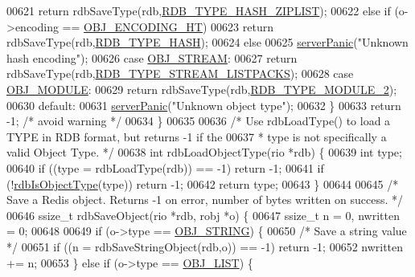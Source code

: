 \begin{DoxyCode}
{{{{{{{{00621             \textcolor{keywordflow}{return} rdbSaveType(rdb,\hyperlink{rdb_8h_af7ff565f65a30ccd4bf55f1503b63946}{RDB\_TYPE\_HASH\_ZIPLIST});
00622         \textcolor{keywordflow}{else} \textcolor{keywordflow}{if} (o->encoding == \hyperlink{server_8h_a9c10219f68afc557d510d108257d238b}{OBJ\_ENCODING\_HT})
00623             \textcolor{keywordflow}{return} rdbSaveType(rdb,\hyperlink{rdb_8h_a61a89168792f4d82b4e5b0e3b02a68ca}{RDB\_TYPE\_HASH});
00624         \textcolor{keywordflow}{else}
00625             \hyperlink{server_8h_a11cc378e7778a830b41240578de3b204}{serverPanic}(\textcolor{stringliteral}{"Unknown hash encoding"});
00626     \textcolor{keywordflow}{case} \hyperlink{server_8h_a2c2cc41300ca6b9daca7ea8a6d66edc6}{OBJ\_STREAM}:
00627         \textcolor{keywordflow}{return} rdbSaveType(rdb,\hyperlink{rdb_8h_a6552781f513eb80def691fe64e90000c}{RDB\_TYPE\_STREAM\_LISTPACKS});
00628     \textcolor{keywordflow}{case} \hyperlink{server_8h_a92c1fed85f709180fda0ff10d37d649b}{OBJ\_MODULE}:
00629         \textcolor{keywordflow}{return} rdbSaveType(rdb,\hyperlink{rdb_8h_a9a996d2f95870c7165faaa316a6f8931}{RDB\_TYPE\_MODULE\_2});
00630     \textcolor{keywordflow}{default}:
00631         \hyperlink{server_8h_a11cc378e7778a830b41240578de3b204}{serverPanic}(\textcolor{stringliteral}{"Unknown object type"});
00632     \}
00633     \textcolor{keywordflow}{return} -1; \textcolor{comment}{/* avoid warning */}
00634 \}
00635 
00636 \textcolor{comment}{/* Use rdbLoadType() to load a TYPE in RDB format, but returns -1 if the}
00637 \textcolor{comment}{ * type is not specifically a valid Object Type. */}
00638 \textcolor{keywordtype}{int} rdbLoadObjectType(rio *rdb) \{
00639     \textcolor{keywordtype}{int} type;
00640     \textcolor{keywordflow}{if} ((type = rdbLoadType(rdb)) == -1) \textcolor{keywordflow}{return} -1;
00641     \textcolor{keywordflow}{if} (!\hyperlink{rdb_8h_aab085218231452c8782bd5f7d8011ce2}{rdbIsObjectType}(type)) \textcolor{keywordflow}{return} -1;
00642     \textcolor{keywordflow}{return} type;
00643 \}
00644 
00645 \textcolor{comment}{/* Save a Redis object. Returns -1 on error, number of bytes written on success. */}
00646 ssize\_t rdbSaveObject(rio *rdb, robj *o) \{
00647     ssize\_t n = 0, nwritten = 0;
00648 
00649     \textcolor{keywordflow}{if} (o->type == \hyperlink{server_8h_a65236ea160f69cdef33ec942092af88f}{OBJ\_STRING}) \{
00650         \textcolor{comment}{/* Save a string value */}
00651         \textcolor{keywordflow}{if} ((n = rdbSaveStringObject(rdb,o)) == -1) \textcolor{keywordflow}{return} -1;
00652         nwritten += n;
00653     \} \textcolor{keywordflow}{else} \textcolor{keywordflow}{if} (o->type == \hyperlink{server_8h_a4a5f22a280949c97a0cb0d4213275126}{OBJ\_LIST}) \{
}}}}}}}}
\end{DoxyCode}
